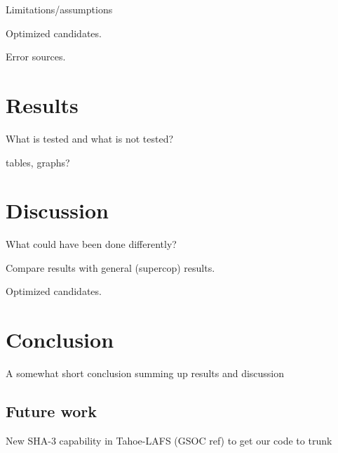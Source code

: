 \documentclass[english,12pt,a4paper]{book}
\begin{document}
Limitations/assumptions

Optimized candidates.

Error sources.


\chapter{Results}

What is tested and what is not tested?

tables, graphs?


\chapter{Discussion}

What could have been done differently?

Compare results with general (supercop) results.

Optimized candidates.

\cite{s_nistround2}


\chapter{Conclusion}

A somewhat short conclusion summing up results and discussion

\section{Future work}

New SHA-3 capability in Tahoe-LAFS (GSOC ref) to get our code to trunk





\appendix
\appendixpage
\addappheadtotoc

\end{document}
